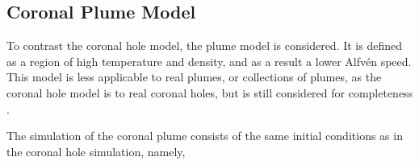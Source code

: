 \documentclass[a4paper]{article}
\numberwithin{figure}{section}
\numberwithin{equation}{section}
\begin{document}

\subsection{Coronal Plume Model}\label{sec:coronal_plume_model} 
To contrast the coronal hole model, the plume model is considered. 
It is defined as a region of high temperature and density, and as a result a lower Alfv\'en speed.
This model is less applicable to real plumes, or collections of plumes, as the coronal hole model is to real coronal holes, but is still considered for completeness \cite{afanasyev2018propagation}. 

\medskip

The simulation of the coronal plume consists of the same initial conditions as in the coronal hole simulation, namely,
\end{document}
